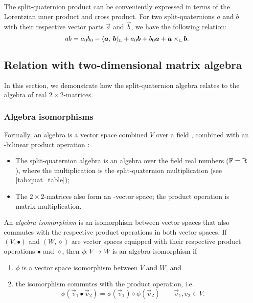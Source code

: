 The split-quaternion product can be conveniently expressed in terms of the Lorentzian inner product and cross product. For two split-quaternions $a$ and $b$ with their respective vector parts $\vec{a}$ and $\vec{b}$, we have the following relation:
\begin{equation}
    ab = a_0 b_0 - \lorinner{\vec{a}}{\vec{b}} + a_0 \vec{b} + b_0 \vec{a} + \lorcrossp{\vec{a}}{\vec{b}}.
\end{equation}

\subsection{Relation with two-dimensional matrix algebra}
\label{ssec:quat_isomorphism}
In this section, we demonstrate how the split-quaternion algebra relates to the algebra of real $2\times2$-matrices.

\subsubsection{Algebra isomorphisms} 
Formally, an algebra is a vector space combined \(V\) over a field \field, combined with an \field-bilinear product operation \cite{Schuller2014}:
\begin{itemize}
    \item The split-quaternion algebra is an algebra over the field real numbers (\(\mathbb{F} = \mathbb{R}\)), where the multiplication is the split-quaternion multiplication (see \cref{tab:quat_table});
    \item The \(2\times2\)-matrices also form an \real-vector space; the product operation is matrix multiplication.
\end{itemize}

An \emph{algebra isomorphism} is an isomorphism between vector spaces that also commutes with the respective product operations in both vector spaces. If \((V, \bullet)\) and \((W, \diamond)\) are vector spaces equipped with their respective product operations $\bullet$ and $\diamond$, then \(\phi: V \to W\) is an algebra isomorphism if \cite{Lang2002}
\begin{enumerate}[label=(\roman*), align=left, leftmargin=1.5cm]
    \item \(\phi\) is a vector space isomorphism between \(V\) and \(W\), and 
    \item the isomorphism commutes with the product operation, i.e. 
    \begin{equation}
        \phi(\vec{v}_1 \bullet \vec{v}_2) = \phi(\vec{v}_1)\diamond\phi(\vec{v}_2) \qquad \vec{v}_1, v_2 \in V.
    \end{equation}
\end{enumerate}

